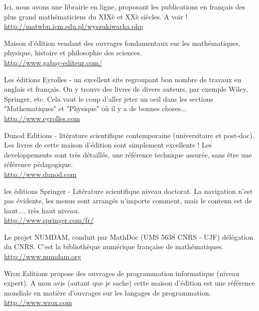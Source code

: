 	{\Large {}}\bcdfrance{} Ici, nous avons une librairie en ligne, proposant les publications en français des plus grand mathématiciens du XIXè et XXè siècles. A voir !\\
	\href{http://matwbn.icm.edu.pl/wyszukiwarka.php}{\color{blue}http://matwbn.icm.edu.pl/wyszukiwarka.php}
	
	{\Large {}}{\Large {}}{\Large {}}{\Large {}}\bcdfrance{} Maison d'édition vendant des ouvrages fondamentaux sur les mathématiques, physique, histoire et philosophie des sciences.\\
	\href{http://www.gabay-editeur.com/}{\color{blue}http://www.gabay-editeur.com/}
	
	\pagebreak
	{\Large {}}{\Large {}}{\Large {}}{\Large {}}\bcdfrance{} Les éditions Eyrolles - un excellent site regroupant bon nombre de travaux en anglais et français. On y trouve des livres de divers auteurs, par exemple Wiley, Springer, etc. Cela vaut le coup d'aller jeter un oeil dans les sections "Mathematiques" et "Physique" où il y a de bonnes choses... \\
	\href{http://www.eyrolles.com}{\color{blue}http://www.eyrolles.com}
	
	{\Large {}}{\Large {}}{\Large {}}{\Large {}}\bcdfrance{} Dunod Editions - litérature scientifique contemporaine (universitaire et post-doc). Les livres de cette maison d'édition sont simplement excellents ! Les developpements sont très détaillés, une référence technique assurée, sans être une référence pédagogique.\\
	\href{http://www.dunod.com}{\color{blue}http://www.dunod.com}
	
	{\Large {}}{\Large {}} les éditions Springer - Litérature scientifique niveau doctorat. La navigation n'est pas évidente, les menus sont arrangés n'importe comment, mais le contenu est de haut.... très haut niveau.\\
	\href{http://www.springer.com/fr/}{\color{blue}http://www.springer.com/fr/}
	
	{\Large {}}{\Large {}}{\Large {}}\bcdfrance{} Le projet NUMDAM, conduit par MathDoc (UMS 5638 CNRS - UJF) délégation du CNRS. C'est la bibliothèque numérique française de mathématiques.\\
	\href{http://www.numdam.org}{\color{blue}http://www.numdam.org}
	
	{\Large {}}{\Large {}}{\Large {}}{\Large {}} Wrox Editions propose des ouvrages de programmation informatique (niveau expert). A mon avis (autant que je sache) cette maison d'édition est une référence mondiale en matière d'ouvrages sur les langages de programmation.\\
	\href{http://www.wrox.com}{\color{blue}http://www.wrox.com}
	
